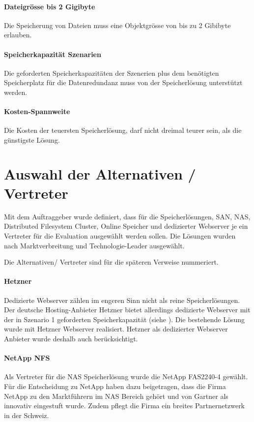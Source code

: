 \setcounter{paragraph}{0}
\renewcommand\theparagraph{KO-\arabic{paragraph}}

\paragraph{Dateigrösse bis 2 Gigibyte}\label{KO-1}
Die Speicherung von Dateien muss eine Objektgrösse von bis zu 2 Gibibyte erlauben.

\paragraph{Speicherkapazität Szenarien}\label{KO-2}
Die geforderten Speicherkapazitäten der Szenerien plus dem benötigten Speicherplatz für die Datenredundanz muss von der Speicherlösung unterstützt werden.

\paragraph{Kosten-Spannweite}\label{KO-3}
Die Kosten der teuersten Speicherlösung, darf nicht dreimal teurer sein, als die günstigste Lösung.

\section{Auswahl der Alternativen / Vertreter}
Mit dem Auftraggeber wurde definiert, dass für die Speicherlösungen, SAN, NAS, Distributed Filesystem Cluster, Online Speicher und dedizierter Webserver je ein Vertreter für die Evaluation ausgewählt werden sollen. Die Lösungen wurden nach Marktverbreitung und Technologie-Leader ausgewählt.

Die Alternativen/ Vertreter sind für die späteren Verweise nummeriert.

\setcounter{paragraph}{0}
\renewcommand\theparagraph{Al-\arabic{paragraph}}
\paragraph{Hetzner}\label{Al-1}
Dedizierte Webserver zählen im engeren Sinn nicht als reine Speicherlösungen. Der deutsche Hosting-Anbieter Hetzner bietet allerdings dedizierte Webserver mit der in Szenario 1 geforderten Speicherkapazität (siehe ). Die bestehende Lösung wurde mit Hetzner Webserver realisiert. Hetzner als dedizierter Webserver Anbieter wurde deshalb auch berücksichtigt. 

\paragraph{NetApp NFS}\label{Al-2}
Als Vertreter für die NAS Speicherlösung wurde die NetApp FAS2240-4 gewählt. Für die Entscheidung zu NetApp haben dazu beigetragen, dass die Firma NetApp zu den Marktführern im NAS Bereich gehört und von Gartner als innovativ eingestuft wurde. Zudem pflegt die Firma ein breites Partnernetzwerk in der Schweiz.


